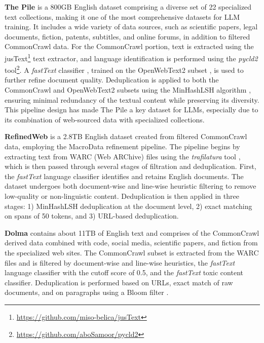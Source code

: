 \textbf{The Pile} \cite{gao_biderman_etal2020} is a 800GB English dataset 
comprising a diverse set of 22 specialized text collections, making it 
one of the most comprehensive datasets for LLM training. It includes a 
wide variety of data sources, such as scientific papers, legal documents, 
fiction, patents, subtitles, and online forums, in addition to 
filtered CommonCrawl data. For the CommonCrawl portion, text is extracted 
using the jusText\footnote{\url{https://github.com/miso-belica/jusText}} 
text extractor, and language identification is performed using the \textit{pycld2} tool\footnote{\url{https://github.com/aboSamoor/pycld2}}. 
A \textit{fastText} classifier \cite{joulin_grave_etal2016b}, trained on 
the OpenWebText2 subset \cite{radford_wu_etal2019,gokaslan_cohen2019}, 
is used to further refine document quality. Deduplication is applied to both the 
CommonCrawl and OpenWebText2 subsets using the MinHashLSH algorithm \cite{broder1997}, 
ensuring minimal redundancy of the textual content while preserving its diversity. 
This pipeline design has made The Pile a key dataset for LLMs, especially due to 
its combination of web-sourced data with specialized collections.

\textbf{RefinedWeb} \cite{penedo_malartic_etal2023} is a 2.8TB English dataset 
created from filtered CommonCrawl data, employing the MacroData refinement 
pipeline. The pipeline begins by extracting text from WARC (Web ARChive) files using the
\textit{trafilatura} tool \cite{barbaresi2021}, which is then passed through 
several stages of filtration and deduplication.
First, the \textit{fastText} language classifier \cite{grave_bojanowski_etal2018}
identifies and retains English documents. The dataset undergoes both 
document-wise and line-wise heuristic filtering to remove low-quality 
or non-linguistic content. Deduplication is then applied in three stages: 
1) MinHashLSH deduplication at the document level, 
2) exact matching on spans of 50 tokens, and 
3) URL-based deduplication. 

\textbf{Dolma} \cite{soldaini_kinney_etal2024} contains about 11TB of English 
text and comprises of the CommonCrawl derived
data combined with code, social media, scientific papers, and fiction from 
the specialized web sites.
The CommonCrawl subset is extracted from the WARC files and is 
filtered by document-wise
and line-wise heuristics, the \textit{fastText} language classifier with 
the cutoff score of 0.5, and the \textit{fastText} toxic content classifier.
Deduplication is performed based on URLs, exact match of raw documents, and
on paragraphs using a Bloom filter \cite{bloom1970}.

